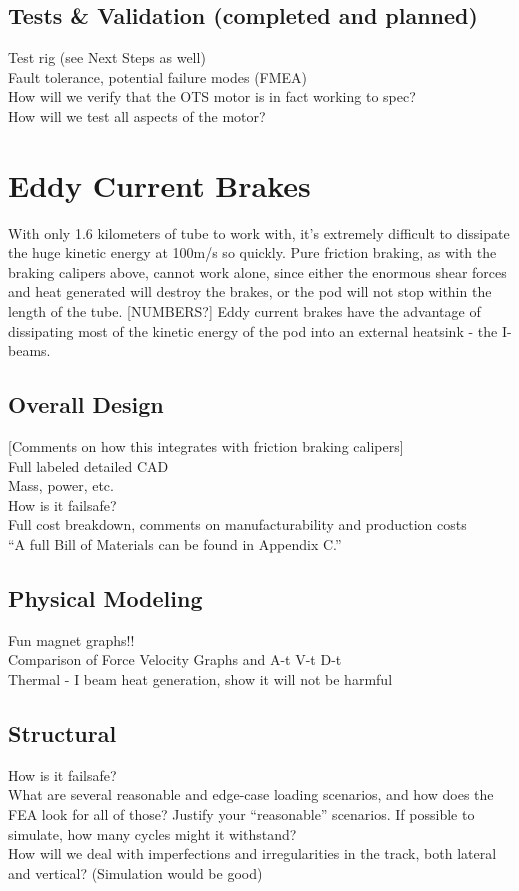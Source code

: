 \documentclass{report}
\begin{document}
    \subsection{Tests \& Validation (completed and planned)}
    Test rig (see Next Steps as well)\\
    Fault tolerance, potential failure modes (FMEA)\\
    How will we verify that the OTS motor is in fact working to spec?\\
    How will we test all aspects of the motor?
    
    \section{Eddy Current Brakes}
    With only 1.6 kilometers of tube to work with, it’s extremely difficult to dissipate the huge kinetic energy at 100m/s so quickly. Pure friction braking, as with the braking calipers above, cannot work alone, since either the enormous shear forces and heat generated will destroy the brakes, or the pod will not stop within the length of the tube. [NUMBERS?] Eddy current brakes have the advantage of dissipating most of the kinetic energy of the pod into an external heatsink - the I-beams.
    
    \subsection{Overall Design}
    [Comments on how this integrates with friction braking calipers]\\
    Full labeled detailed CAD\\
    Mass, power, etc.\\
    How is it failsafe?\\
    Full cost breakdown, comments on manufacturability and production costs\\
    “A full Bill of Materials can be found in Appendix C.”
    
    \subsection{Physical Modeling}
    Fun magnet graphs!!\\
    Comparison of Force Velocity Graphs and A-t V-t D-t\\
    Thermal - I beam heat generation, show it will not be harmful
    
    \subsection{Structural}
    How is it failsafe?\\
    What are several reasonable and edge-case loading scenarios, and how does the FEA look for all of those? Justify your “reasonable” scenarios. If possible to simulate, how many cycles might it withstand?\\
    How will we deal with imperfections and irregularities in the track, both lateral and vertical? (Simulation would be good)
    
\end{document}

